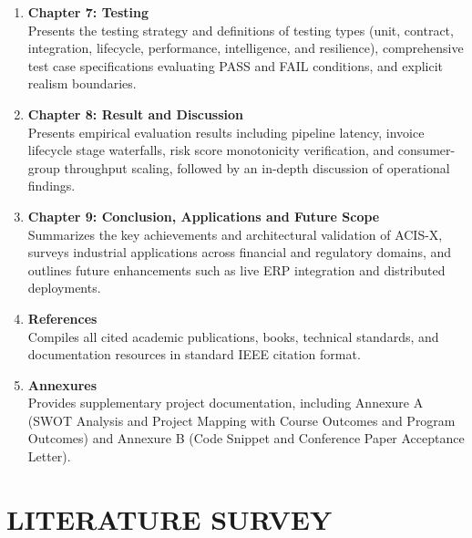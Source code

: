 \documentclass[a4paper, 12pt]{report}
\begin{document}
\begin{enumerate}[label=\textbf{\roman*.}, itemsep=2pt]
\vspace{5em}

    \item \textbf{Chapter 7: Testing} \\
    Presents the testing strategy and definitions of testing types (unit, contract, integration, lifecycle, performance, intelligence, and resilience), comprehensive test case specifications evaluating PASS and FAIL conditions, and explicit realism boundaries.
    
    \item \textbf{Chapter 8: Result and Discussion} \\
    Presents empirical evaluation results including pipeline latency, invoice lifecycle stage waterfalls, risk score monotonicity verification, and consumer-group throughput scaling, followed by an in-depth discussion of operational findings.
    
    \item \textbf{Chapter 9: Conclusion, Applications and Future Scope} \\
    Summarizes the key achievements and architectural validation of ACIS-X, surveys industrial applications across financial and regulatory domains, and outlines future enhancements such as live ERP integration and distributed deployments.
    
    \item \textbf{References} \\
    Compiles all cited academic publications, books, technical standards, and documentation resources in standard IEEE citation format.
    
    \item \textbf{Annexures} \\
    Provides supplementary project documentation, including Annexure A (SWOT Analysis and Project Mapping with Course Outcomes and Program Outcomes) and Annexure B (Code Snippet and Conference Paper Acceptance Letter).
\end{enumerate}



\chapter{LITERATURE SURVEY}

\leavevmode{}
\end{document}
